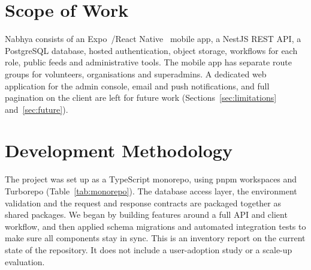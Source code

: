 \section{Scope of Work}
Nabhya consists of an Expo~\cite{expo}/React Native~\cite{reactnative} mobile app, a NestJS REST API, a PostgreSQL database, hosted authentication, object storage, workflows for each role, public feeds and administrative tools. The mobile app has separate route groups for volunteers, organisations and superadmins. A dedicated web application for the admin console, email and push notifications, and full pagination on the client are left for future work (Sections~\ref{sec:limitations} and~\ref{sec:future}).

\section{Development Methodology}
The project was set up as a TypeScript monorepo, using pnpm workspaces and Turborepo (Table~\ref{tab:monorepo}). The database access layer, the environment validation and the request and response contracts are packaged together as shared packages. We began by building features around a full API and client workflow, and then applied schema migrations and automated integration tests to make sure all components stay in sync. This is an inventory report on the current state of the repository. It does not include a user-adoption study or a scale-up evaluation.


